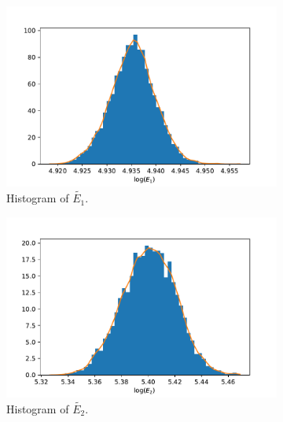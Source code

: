 \begin{figure}[h!]
\centering
\begin{subfigure}{0.5\textwidth}
\centering
\includegraphics[width=\linewidth]{figures/bayesian/2_reactions/mass_close/hist_E1.pdf}
\caption{Histogram of $\tilde{E_1}$.}
\label{HistE12}
\end{subfigure}%
\begin{subfigure}{0.5\textwidth}
\centering
\includegraphics[width=\linewidth]{figures/bayesian/2_reactions/mass_close/hist_E2.pdf}
\caption{Histogram of $\tilde{E_2}$.}
\label{HistE22}
\end{subfigure}
\newline
\begin{subfigure}{0.5\textwidth}
\centering

\end{subfigure}
\end{figure}
